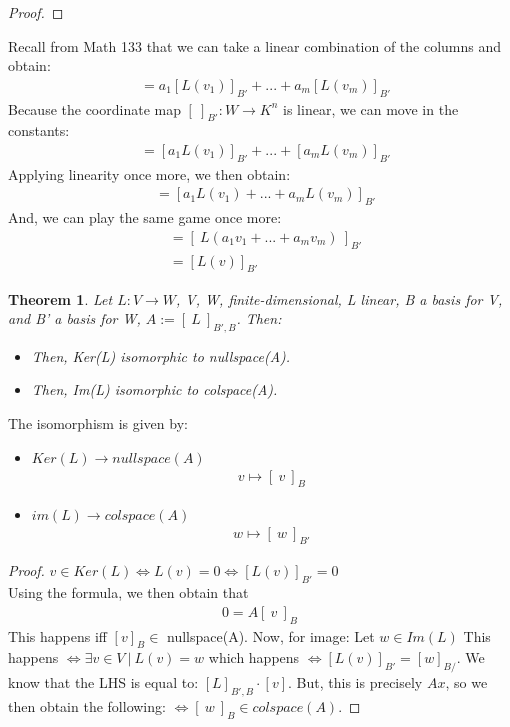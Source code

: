 \documentclass[a4paper, 12pt]{article}
\newtheorem{theorem}{Theorem}
\theoremstyle{definition}
\theoremstyle{definition}
\theoremstyle{definition}
\theoremstyle{definition}
\begin{document}
{\begin{proof}
\end{proof}
Recall from Math 133 that we can take a linear combination of the columns  and obtain: 
\begin{align*}
	& = a_1 [L(v_1)]_{B'} + ... + a_m [L(v_m)]_{B'}
\end{align*}
Because the coordinate map $[\ ]_{B'}: W \rightarrow K^n$ is linear, we can move in the constants: 
\begin{align*}
	& = [a_1L(v_1)]_{B'} + ... + [a_mL(v_m)]_{B'}
\end{align*}
Applying linearity once more, we then obtain:
\begin{align*}
	& = [a_1 L(v_1) + ... + a_m L(v_m)]_{B'}
\end{align*}
And, we can play the same game once more: 
\begin{align*}
	&= [\ L(a_1v_1 + ... + a_m v_m)\ ]_{B'}\\
	& = [L(v)]_{B'}
\end{align*}
\begin{theorem}
	Let $L: V \rightarrow W$, V, W, finite-dimensional, L linear, B a basis for V, and B' a basis for W, $A:=[\ L\ ]_{B',B}$. Then:
	\begin{itemize}
		\item Then, Ker(L) isomorphic to nullspace(A). 
		\item Then, Im(L) isomorphic to colspace(A). 
	\end{itemize} 
\end{theorem}
The isomorphism is given by:
\begin{itemize}
	\item $Ker(L) \rightarrow nullspace(A)$ 
	\begin{align*}
		v \mapsto [\ v\ ]_B
	\end{align*}
	\item $im(L) \rightarrow colspace(A)$ 
	\begin{align*}
		w \mapsto [\ w\ ]_{B'} 
	\end{align*}
\end{itemize}

\begin{proof}
	$v \in Ker(L) \iff L(v) = 0 \iff [L(v)]_{B'} = 0 $ \\
	Using the formula, we then obtain that
	\begin{align*}
		0 = A [\ v\ ]_B
	\end{align*}
	This happens iff $[v]_B \in $ nullspace(A). Now, for image: Let $w \in Im(L)$ This happens $\iff \exists v \in V\ |\ L(v) = w$ which happens $\iff [L(v)]_{B'} = [w]_{B/}$. We know that the LHS is equal to: $[L]_{B', B} \cdot [v]$. But, this is precisely $Ax$, so we then obtain the following: $\iff [\ w\ ]_B \in colspace(A)$. 
\end{proof}

}
\end{document}
